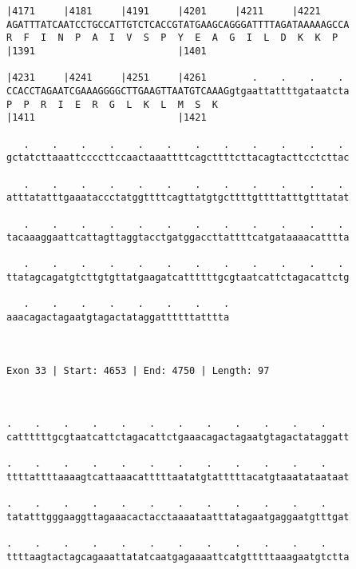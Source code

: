 \documentclass{article}
\begin{document}
\begin{Verbatim}
|4171     |4181     |4191     |4201     |4211     |4221     
AGATTTATCAATCCTGCCATTGTCTCACCGTATGAAGCAGGGATTTTAGATAAAAAGCCA
R  F  I  N  P  A  I  V  S  P  Y  E  A  G  I  L  D  K  K  P  
|1391                         |1401                         
  
|4231     |4241     |4251     |4261        .    .    .    . 
CCACCTAGAATCGAAAGGGGCTTGAAGTTAATGTCAAAGgtgaattattttgataatcta
P  P  R  I  E  R  G  L  K  L  M  S  K                       
|1411                         |1421                         
  
   .    .    .    .    .    .    .    .    .    .    .    . 
gctatcttaaattccccttccaactaaattttcagcttttcttacagtacttcctcttac
                                                            
   .    .    .    .    .    .    .    .    .    .    .    . 
atttatatttgaaataccctatggttttcagttatgtgcttttgttttatttgtttatat
                                                            
   .    .    .    .    .    .    .    .    .    .    .    . 
tacaaaggaattcattagttaggtacctgatggaccttattttcatgataaaacatttta
                                                            
   .    .    .    .    .    .    .    .    .    .    .    . 
ttatagcagatgtcttgtgttatgaagatcattttttgcgtaatcattctagacattctg
                                                            
   .    .    .    .    .    .    .    .
aaacagactagaatgtagactataggattttttatttta
                                       
                                       
 
Exon 33 | Start: 4653 | End: 4750 | Length: 97



.    .    .    .    .    .    .    .    .    .    .    .    
cattttttgcgtaatcattctagacattctgaaacagactagaatgtagactataggatt
                                                            
.    .    .    .    .    .    .    .    .    .    .    .    
ttttattttaaaagtcattaaacatttttaatatgtatttttacatgtaaatataataat
                                                            
.    .    .    .    .    .    .    .    .    .    .    .    
tatatttgggaaggttagaaacactacctaaaataatttatagaatgaggaatgtttgat
                                                            
.    .    .    .    .    .    .    .    .    .    .    .    
ttttaagtactagcagaaattatatcaatgagaaaattcatgtttttaaagaatgtctta
                                                            

\end{Verbatim}
\end{document}
